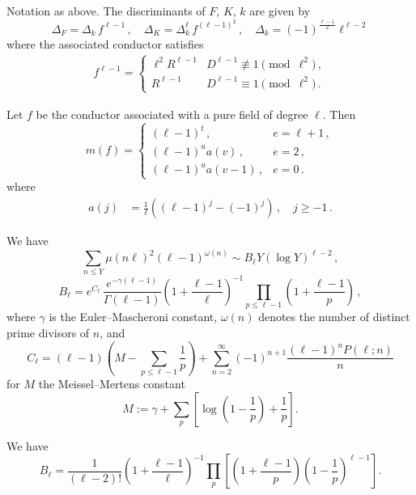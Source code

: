 \documentclass[10pt,a4paper]{amsart}
\begin{document}
\begin{lemma}\label{L:1}
Notation as above.  The discriminants of $F$, $K$, $k$ are given by
$$
  \Delta_{F}=\Delta_k\, f^{\ell-1}
  \,,\quad
  \Delta_K=\Delta_k^{\ell}\, f^{(\ell-1)^2}
  \,,\quad
  \Delta_k=(-1)^{\frac{\ell-1}{2}}\ell^{\ell-2}
$$
where the associated conductor satisfies
\begin{align*}
f^{\ell-1}=\begin{cases}
\ell^2 R^{\ell-1} & D^{\ell-1}\not\equiv 1\pmod{\ell^2}\,,\\
R^{\ell-1} & D^{\ell-1}\equiv 1\pmod{\ell^2}\,.
\end{cases}
\end{align*}
\end{lemma}

\begin{lemma}\label{L:2}
Let $f$ be the conductor associated with a pure field of degree $\ell$.
Then
$$
m(f)=\begin{cases}
(\ell-1)^t\,, &e=\ell+1\,,\\ 
(\ell-1)^{u} a(v)\,, & e=2\,,\\
(\ell-1)^{u} a(v-1)\,, & e=0\,.
\end{cases}
$$
where
\begin{align*}
a(j)&=\frac{1}{\ell}\left((\ell-1)^j-(-1)^j\right)
\,,\quad j \geq -1\,.
\end{align*}
\end{lemma}

\begin{lemma}\label{L:sum}
We have
$$
\sum_{n \leq Y} \mu(n\ell)^2(\ell-1)^{\omega(n)}
\sim
B_\ell
Y(\log Y)^{\ell-2}
\,,
$$
$$
  B_\ell=
  e^{C_\ell}\,\frac{e^{-\gamma(\ell-1)}}{\Gamma(\ell-1)} \left( 1 + \frac{\ell-1}{\ell}\right)^{-1} \prod_{p \leq \ell-1} \left( 1 + \frac{\ell-1}{p} \right)
  \,,
$$
where $\gamma$ is the Euler--Mascheroni constant, $\omega(n)$ denotes the number of distinct prime divisors of $n$, and 
\[ C_{\ell}= (\ell-1)\left(M - \sum_{p\leq \ell-1} \frac{1}{p}\right) +\sum_{n=2}^\infty (-1)^{n+1}\frac{(\ell-1)^n P(\ell;n)}{n}\] for $M$ the Meissel--Mertens constant
\[ M:=\gamma+ \sum_p \left[\log\left(1 - \frac{1}{p} \right) + \frac{1}{p} \right].\]
\end{lemma}

\begin{lemma} \label{L:constant}
    We have 
    \[ B_{\ell} = \frac{1}{(\ell-2)!} \left( 1 + \frac{\ell-1}{\ell} \right)^{-1}\prod_{p} \left[ \left( 1 + \frac{\ell-1}{p} \right)\left( 1 - \frac{1}{p} \right)^{\ell-1} \right].\]
\end{lemma}
\end{document}
